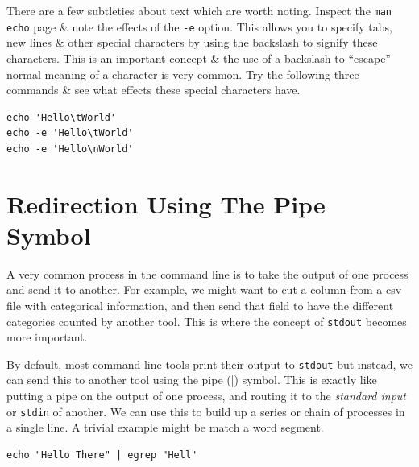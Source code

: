 \documentclass[a4paper,12pt,twoside]{memoir}
\begin{document}
\begin{information}
There are a few subtleties about text which are worth noting.
Inspect the \texttt{man echo} page \& note the effects of the \texttt{-e} option.
This allows you to specify tabs, new lines \& other special characters by using the backslash to signify these characters.
This is an important concept \& the use of a backslash to ``escape'' normal meaning of a character is very common.
Try the following three commands \& see what effects these special characters have.
\end{information}
\begin{steps}
\begin{lstlisting}
echo 'Hello\tWorld'
echo -e 'Hello\tWorld'
echo -e 'Hello\nWorld'
\end{lstlisting}
\end{steps}


\section{Redirection Using The Pipe Symbol}
\begin{information}
A very common process in the command line is to take the output of one process and send it to another.
For example, we might want to cut a column from a csv file with categorical information, and then send that field to have the different categories counted by another tool.
This is where the concept of \texttt{stdout} becomes more important. \\
\end{information}

\begin{steps}
By default, most command-line tools print their output to \texttt{stdout} but instead, we can send this to another tool using the pipe (|) symbol.
This is exactly like putting a pipe on the output of one process, and routing it to the \textit{standard input} or \texttt{stdin} of another.
We can use this to build up a series or chain of processes in a single line.
A trivial example might be match a word segment.
\begin{lstlisting}
echo "Hello There" | egrep "Hell"
\end{lstlisting}
\end{steps}
\end{document}
